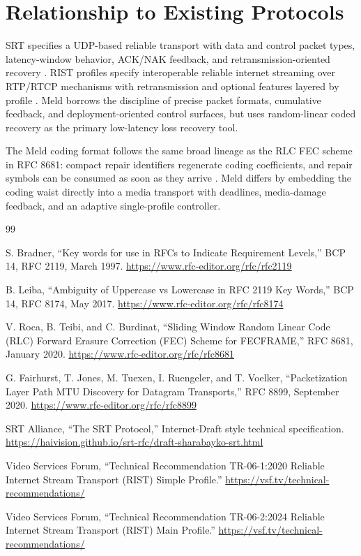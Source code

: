 \documentclass[11pt]{article}
\begin{document}
\appendix

\section{Relationship to Existing Protocols}

SRT specifies a UDP-based reliable transport with data and control packet types,
latency-window behavior, ACK/NAK feedback, and retransmission-oriented recovery
\cite{srt-rfc}. RIST profiles specify interoperable reliable internet streaming
over RTP/RTCP mechanisms with retransmission and optional features layered by
profile \cite{rist-tr061,rist-tr062}. Meld borrows the discipline of precise
packet formats, cumulative feedback, and deployment-oriented control surfaces,
but uses random-linear coded recovery as the primary low-latency loss recovery
tool.

The Meld coding format follows the same broad lineage as the RLC FEC scheme in
RFC 8681: compact repair identifiers regenerate coding coefficients, and repair
symbols can be consumed as soon as they arrive \cite{rfc8681}. Meld differs by
embedding the coding waist directly into a media transport with deadlines,
media-damage feedback, and an adaptive single-profile controller.

\begin{thebibliography}{99}

S. Bradner, ``Key words for use in RFCs to Indicate Requirement Levels,''
BCP 14, RFC 2119, March 1997. \url{https://www.rfc-editor.org/rfc/rfc2119}

B. Leiba, ``Ambiguity of Uppercase vs Lowercase in RFC 2119 Key Words,''
BCP 14, RFC 8174, May 2017. \url{https://www.rfc-editor.org/rfc/rfc8174}

V. Roca, B. Teibi, and C. Burdinat, ``Sliding Window Random Linear Code
(RLC) Forward Erasure Correction (FEC) Scheme for FECFRAME,'' RFC 8681,
January 2020. \url{https://www.rfc-editor.org/rfc/rfc8681}

G. Fairhurst, T. Jones, M. Tuexen, I. Ruengeler, and T. Voelker, ``Packetization
Layer Path MTU Discovery for Datagram Transports,'' RFC 8899, September 2020.
\url{https://www.rfc-editor.org/rfc/rfc8899}

SRT Alliance, ``The SRT Protocol,'' Internet-Draft style technical
specification. \url{https://haivision.github.io/srt-rfc/draft-sharabayko-srt.html}

Video Services Forum, ``Technical Recommendation TR-06-1:2020 Reliable Internet
Stream Transport (RIST) Simple Profile.'' \url{https://vsf.tv/technical-recommendations/}

Video Services Forum, ``Technical Recommendation TR-06-2:2024 Reliable Internet
Stream Transport (RIST) Main Profile.'' \url{https://vsf.tv/technical-recommendations/}

\end{thebibliography}
\end{document}
